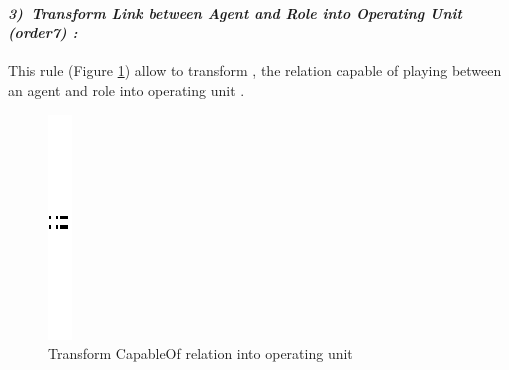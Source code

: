 \paragraph{\emph{3)~Transform Link between Agent and Role into Operating Unit (order7) :} }
 
 
This rule (Figure \ref{fig:Operating Unit for every link capable of playing}) allow to transform , the relation capable of playing between an agent and role  into operating unit .
\vspace{1cm}
\begin{figure}[th]
\centering

\quad{}
\includegraphics{Chapiter3/img/sep}
\quad{}
 
 
\caption{\label{fig:Operating Unit for every link capable of playing}Transform CapableOf relation into operating unit} 
\end{figure}


